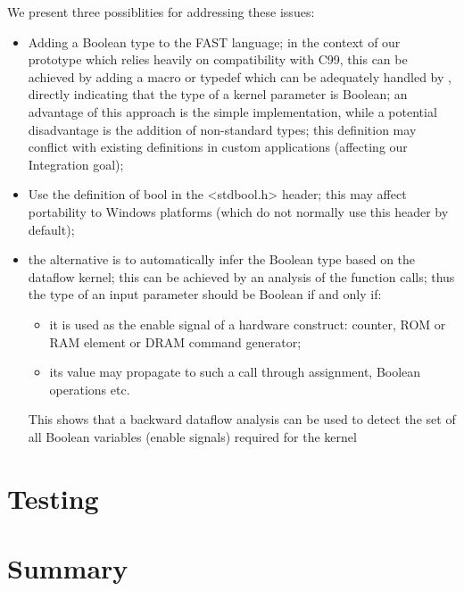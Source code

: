 We present three possiblities for addressing these issues:
\begin{itemize}
\item Adding a Boolean type to the FAST language; in the context of
  our prototype which relies heavily on compatibility with C99, this
  can be achieved by adding a macro or typedef which can be adequately
  handled by \fastc{}, directly indicating that the type of a kernel
  parameter is Boolean; an advantage of this approach is the simple
  implementation, while a potential disadvantage is the addition of
  non-standard types; this definition may  conflict with existing definitions
  in custom applications (affecting our Integration goal);

\item Use the definition of bool in the <stdbool.h> header; this may
  affect portability to Windows platforms (which do not normally use
  this header by default);

\item the alternative is to automatically infer the Boolean type based
  on the dataflow kernel; this can be achieved by an analysis of the
  function calls; thus the type of an input parameter should be
  Boolean if and only if:
  \begin{itemize}
  \item it is used as the enable signal of a hardware construct:
    counter, ROM or RAM element or DRAM command generator;
  \item its value may propagate to such a call through assignment,
    Boolean operations etc.
  \end{itemize}
  This shows that a backward dataflow analysis \cite{aho1977principles}\cite{cooper2011engineering}can be used to
  detect the set of all Boolean variables (enable signals) required
  for the kernel
\end{itemize}


\section{Testing}

\section{Summary}